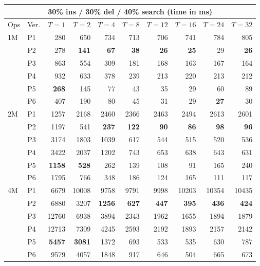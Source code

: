 \begin{tabular}{llrrrrrrrr}
\toprule
\multicolumn{10}{c}{\textbf{30\% ins / 30\% del / 40\% search} (time in ms)} \\
\midrule
Ops & Ver. & $T{=}1$ & $T{=}2$ & $T{=}4$ & $T{=}8$ & $T{=}12$ & $T{=}16$ & $T{=}24$ & $T{=}32$ \\
\midrule
1M & P1 & 280 & 650 & 734 & 713 & 706 & 741 & 784 & 805 \\
 & P2 & 278 & \textbf{141} & \textbf{67} & \textbf{38} & \textbf{26} & \textbf{25} & 29 & \textbf{26} \\
 & P3 & 863 & 554 & 309 & 181 & 168 & 163 & 167 & 164 \\
 & P4 & 932 & 633 & 378 & 239 & 213 & 220 & 213 & 212 \\
 & P5 & \textbf{268} & 145 & 77 & 43 & 35 & 29 & 60 & 89 \\
 & P6 & 407 & 190 & 80 & 45 & 31 & 29 & \textbf{27} & 30 \\
\midrule
2M & P1 & 1257 & 2168 & 2460 & 2366 & 2463 & 2494 & 2613 & 2601 \\
 & P2 & 1197 & 541 & \textbf{237} & \textbf{122} & \textbf{90} & \textbf{86} & \textbf{98} & \textbf{96} \\
 & P3 & 3174 & 1803 & 1039 & 617 & 544 & 515 & 520 & 536 \\
 & P4 & 3422 & 2037 & 1202 & 743 & 653 & 638 & 643 & 631 \\
 & P5 & \textbf{1158} & \textbf{528} & 262 & 139 & 108 & 91 & 165 & 240 \\
 & P6 & 1795 & 766 & 348 & 186 & 124 & 165 & 111 & 117 \\
\midrule
4M & P1 & 6679 & 10008 & 9758 & 9791 & 9998 & 10203 & 10354 & 10435 \\
 & P2 & 6880 & 3207 & \textbf{1256} & \textbf{627} & \textbf{447} & \textbf{395} & \textbf{436} & \textbf{424} \\
 & P3 & 12760 & 6938 & 3894 & 2343 & 1962 & 1655 & 1894 & 1879 \\
 & P4 & 12713 & 7309 & 4245 & 2593 & 2192 & 1893 & 2157 & 2142 \\
 & P5 & \textbf{5457} & \textbf{3081} & 1372 & 693 & 533 & 535 & 630 & 787 \\
 & P6 & 9579 & 4057 & 1848 & 917 & 646 & 504 & 665 & 673 \\
\bottomrule
\end{tabular}
\vspace{1em}

